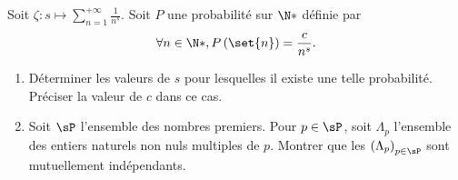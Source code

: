 \begin{enonce}
\begin{exercise}[ID={RMS133 E760},subtitle={Mines-Ponts 2022},tags={},difficulty={}]
  Soit $\zeta:s\mapsto \sum_{n=1}^{+\infty} \frac{1}{n^s}$.
  Soit $P$ une probabilité sur $\N*$ définie par
  \begin{equation*}
    \forall n\in\N*, P\left( \set{n} \right) = \frac{c}{n^s}.
  \end{equation*}
  \begin{enumerate}
    \item Déterminer les valeurs de $s$ pour lesquelles il existe une telle probabilité.
      Préciser la valeur de $c$ dans ce cas.

    \item Soit $\sP$ l'ensemble des nombres premiers.
      Pour $p\in\sP$, soit $\Lambda_p$ l'ensemble des entiers naturels non nuls multiples de $p$.
      Montrer que les $\left( \Lambda_p \right)_{p\in\sP}$ sont mutuellement indépendants.
  \end{enumerate}
\end{exercise}
\begin{solution}
\end{solution}
\end{enonce}
